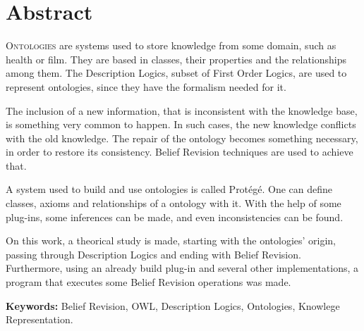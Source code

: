 \chapter*{Abstract}

\lettrine{O}{ntologies} are systems used to store knowledge from some domain, such as health or film. They are based in classes, their properties and the relationships among them. The Description Logics, subset of First Order Logics, are used to represent ontologies, since they have the formalism needed for it.

The inclusion of a new information, that is inconsistent with the knowledge base, is something very common to happen. In such cases, the new knowledge conflicts with the old knowledge. The repair of the ontology becomes something necessary, in order to restore its consistency. Belief Revision techniques are used to achieve that.

A system used to build and use ontologies is called Protégé. One can define classes, axioms and relationships of a ontology with it. With the help of some plug-ins, some inferences can be made, and even inconsistencies can be found.

On this work, a theorical study is made, starting with the ontologies' origin, passing through Description Logics and ending with Belief Revision. Furthermore, using an already build plug-in and several other implementations, a program that executes some Belief Revision operations was made.

\noindent \textbf{Keywords:} Belief Revision, OWL, Description Logics, Ontologies, Knowlege Representation.